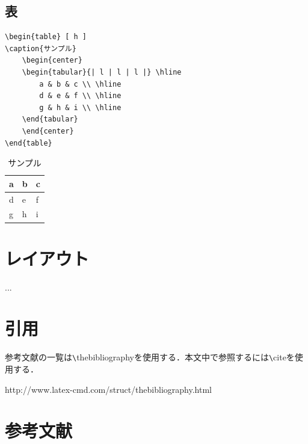 \documentclass[11pt,a4paper]{jsarticle}
\begin{document}
\subsection{表}

\begin{lstlisting}
\begin{table} [ h ]
\caption{サンプル}
	\begin{center}
	\begin{tabular}{| l | l | l |} \hline
		a & b & c \\ \hline
		d & e & f \\ \hline
		g & h & i \\ \hline
	\end{tabular}
	\end{center}
\end{table}
\end{lstlisting}

\begin{table} [ h ]
\caption{サンプル}
	\begin{center}
	\begin{tabular}{| l | l | l |} \hline
		a & b & c \\ \hline
		d & e & f \\ \hline
		g & h & i \\ \hline
	\end{tabular}
	\end{center}
\end{table}

\section{レイアウト}
...

\section{引用}
参考文献の一覧は\verb|\|thebibliographyを使用する．本文中で参照するには\verb|\|citeを使用する\cite{bibliography}．

\begin{thebibliography}{9}
	 http://www.latex-cmd.com/struct/thebibliography.html
\end{thebibliography}



\section{参考文献}
\end{document}
